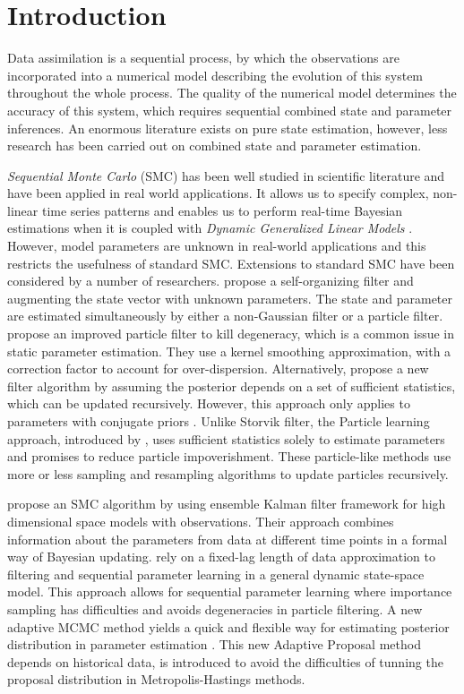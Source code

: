 
\section{Introduction}

Data assimilation is a sequential process, by which the observations are incorporated into a numerical model describing the evolution of this system throughout the whole process. The quality of the numerical model determines the accuracy of this system, which requires sequential combined state and parameter inferences. An enormous literature exists on pure state estimation, however, less research has been carried out on combined state and parameter estimation.

\textit{Sequential Monte Carlo} (SMC) has been well studied in scientific literature and have been applied in real world applications. It allows us to specify complex, non-linear time series patterns and enables us to perform real-time Bayesian estimations when it is coupled with \textit{Dynamic Generalized Linear Models} \citep{vieira2016online}. However, model parameters are unknown in real-world applications and this restricts the usefulness of standard SMC. Extensions to standard SMC have been considered by a number of researchers. \cite{kitagawa1998self} propose a self-organizing filter and augmenting the state vector with unknown parameters. The state and parameter are estimated simultaneously by either a non-Gaussian filter or a particle filter. \cite{liu2001combined} propose an improved particle filter to kill degeneracy, which is a common issue in static parameter estimation. They use a kernel smoothing approximation, with a correction factor to account for over-dispersion. Alternatively, \cite{storvik2002particle} propose a new filter algorithm by assuming the posterior depends on a set of sufficient statistics, which can be updated recursively. However, this approach only applies to parameters with conjugate priors \citep{stroud2018bayesian}. Unlike Storvik filter, the Particle learning approach, introduced by \cite{carvalho2010particle}, uses sufficient statistics solely to estimate parameters and promises to reduce particle impoverishment. These particle-like methods use more or less sampling and resampling algorithms to update particles recursively. 

\cite{stroud2018bayesian} propose an SMC algorithm by using ensemble Kalman filter framework for high dimensional space models with observations. Their approach combines information about the parameters from data at different time points in a formal way of Bayesian updating. \cite{polson2008practical} rely on a fixed-lag length of data approximation to filtering and sequential parameter learning in a general dynamic state-space model. This approach allows for sequential parameter learning where importance sampling has difficulties and avoids degeneracies in particle filtering. A new adaptive MCMC method yields a quick and flexible way for estimating posterior distribution in parameter estimation \citep{haario1999adaptive}. This new Adaptive Proposal method depends on historical data, is introduced to avoid the difficulties of tunning the proposal distribution in Metropolis-Hastings methods. 




